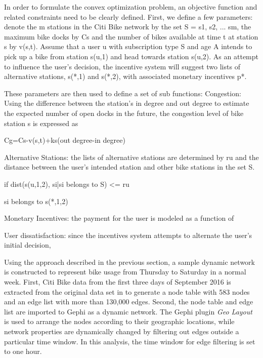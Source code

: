 \documentclass[times, 10pt,twocolumn]{article}
\begin{document}
In order to formulate the convex optimization problem, an objective function and related constraints need to be clearly defined. First, we define a few parameters: denote the m stations in the Citi Bike network by the set S = {s1, s2, ... sm}, the maximum bike docks by Cs and the number of bikes available at time t at station s by v(s,t). Assume that a user u with subscription type S and age A intends to pick up a bike from station s(u,1) and head towards station s(u,2). As an attempt to influence the user's decision, the incentive system will suggest two lists of alternative stations, s(*,1) and s(*,2), with associated monetary incentives p*. %

These parameters are then used to define a set of sub functions:
Congestion: Using the difference between the station's in degree and out degree to estimate the expected number of open docks in the future, the congestion level of bike station s is expressed as 
\centerline{Cg=Cs-v(s,t)+ks(out degree-in degree)}

Alternative Stations: the lists of alternative stations are determined by ru and the distance between the user's intended station and other bike stations in the set S.
\centerline{if dist(s(u,1,2), si|si belongs to S) <= ru}
\centerline{si belongs to s(*,1,2)}

Monetary Incentives: the payment for the user is modeled as a function of 

User dissatisfaction: since the incentives system attempts to alternate the user's initial decision, 

Using the approach described in the previous section, a sample dynamic network is constructed to represent bike usage from Thursday to Saturday in a normal week. First, Citi Bike data from the first three days of September 2016 is extracted from the original data set in \cite{dataset} to generate a node table with 583 nodes and an edge list with more than 130,000 edges. Second, the node table and edge list are imported to Gephi as a dynamic network. The Gephi plugin \textit{Geo Layout} is used to arrange the nodes according to their geographic locations, while network properties are dynamically changed by filtering out edges outside a particular time window. In this analysis, the time window for edge filtering is set to one hour.\\
\end{document}
